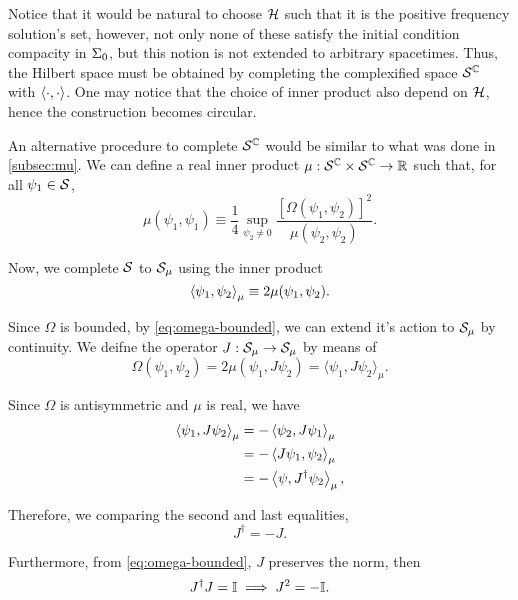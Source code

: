 Notice that it would be natural to choose \({\mathcal{H}}\) such that it is the positive frequency solution's set, however, not only none of these satisfy the initial condition compacity in \(\Sigma_0\), but this notion is not extended to arbitrary spacetimes. Thus, the Hilbert space must be obtained by completing the complexified space \({\mathcal{S}}^{\mathbb{C}}\) with \(\left\langle \cdot, \cdot\right\rangle\). One may notice that the choice of inner product also depend on \({\mathcal{H}}\), hence the construction becomes circular.

An alternative procedure to complete \({\mathcal{S}}^{\mathbb{C}}\) would be similar to what was done in \cref{subsec:mu}. We can define a real inner product \(\mu:{\mathcal{S}}^{{\mathbb{C}}}\times{\mathcal{S}}^{\mathbb{C}}\to{\mathbb{R}}\) such that, for all \(\psi_1\in{\mathcal{S}}\),
\begin{equation}
    \mu(\psi_1,\psi_1)\equiv\frac{1}{4}\sup_{\psi_2\neq 0}{\frac{\left[\Omega(\psi_1,\psi_2)\right]^2}{\mu(\psi_2,\psi_2)}}.
    \label{eq:omega-bounded}
\end{equation}

Now, we complete \({\mathcal{S}}\) to \({\mathcal{S}}_\mu\) using the inner product
\begin{equation}
    \left\langle \psi_1,\psi_2\right\rangle_{\mu}\equiv 2\mu(\psi_1,\psi_2).
\end{equation}

Since \(\Omega\) is bounded, by \cref{eq:omega-bounded}, we can extend it's action to \({\mathcal{S}}_{\mu}\) by continuity. We deifne the operator \(J:{\mathcal{S}}_\mu\to{\mathcal{S}}_\mu\) by means of
\begin{equation}
    \Omega(\psi_1,\psi_2)=2\mu(\psi_1,J\psi_2)=\langle\psi_1,J\psi_2\rangle_\mu.
\end{equation}

Since \(\Omega\) is antisymmetric and \(\mu\) is real, we have
\begin{subequations}
    \begin{align}
        \left\langle \psi_1,J\psi_2\right\rangle_{\mu}&=-\left\langle \psi_2,J\psi_1\right\rangle_{\mu}\\
        &=-\left\langle J\psi_1,\psi_2\right\rangle_{\mu}\\
        &=-\left\langle \psi,J^{\dagger}\psi_2\right\rangle_{\mu},
    \end{align}
\end{subequations}

Therefore, we comparing the second and last equalities,
\begin{equation}
    J^{\dagger}=-J.
\end{equation}

Furthermore, from \cref{eq:omega-bounded}, \(J\) preserves the norm, then
\begin{equation}
    J^{\dagger}J={\mathbb{I}}\implies J^2=-{\mathbb{I}}.
\end{equation}

